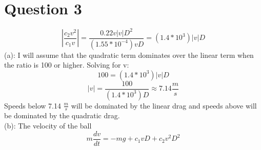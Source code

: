 \documentclass[a4paper,12pt]{article}
\begin{document}
\newpage
\section*{Question 3}
\[\left|\frac{c_2v^2}{c_1v}\right|=\frac{0.22v\left|v\right|D^2}{(1.55\ast10^{-4})vD}=(1.4\ast10^3)\left|v\right|D\](a):
I
will assume that the quadratic term dominates over the linear term
when the ratio is 100 or higher.  Solving for v:
\[100=(1.4\ast10^3)\left|v\right|D\]
\[\left|v\right|=\frac{100}{(1.4\ast10^3)D}\approx7.14\frac{m}{s}\]
Speeds below 7.14 $\frac{m}{s}$ will be dominated by the linear drag
and speeds above will be dominated by the quadratic drag.\\
(b): The velocity of the ball \[m\frac{dv}{dt}=-mg+c_1vD+c_2v^2D^2\]
\end{document}
